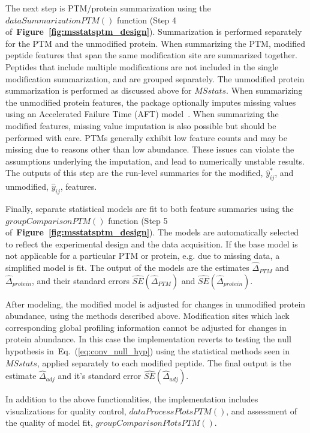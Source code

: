 \documentclass[mcp]{article}
\numberwithin{table}{section}
\def\eqref#1{Eq.~(\ref{eq:#1})}
\def\figref#1{{\bf Figure~\ref{fig:#1}}}
\begin{document}
The next step is PTM/protein summarization using the $dataSummarizationPTM()$ function (Step 4 of~\figref{msstatsptm_design}). Summarization is performed separately for the PTM and the unmodified protein. When summarizing the PTM, modified peptide features that span the same modification site are summarized together. Peptides that include multiple modifications are not included in the single modification summarization, and are grouped separately. The unmodified protein summarization is performed as discussed above for $MSstats$. When summarizing the unmodified protein features, the package optionally imputes missing values using an Accelerated Failure Time (AFT) model~\cite{Wei:1992}. When summarizing the modified features, missing value imputation is also possible but should be performed with care. PTMs generally exhibit low feature counts and may be missing due to reasons other than low abundance. These issues can violate the assumptions underlying the imputation, and lead to numerically unstable results. The outputs of this step are the run-level summaries for the modified, $\hat{y}_{ij}^{\ast}$, and unmodified, $\hat{y}_{ij}$, features.

Finally, separate statistical models are fit to both feature summaries using the $groupComparisonPTM()$ function (Step 5 of~\figref{msstatsptm_design}). The models are automatically selected to reflect the experimental design and the data acquisition. If the base model is not applicable for a particular PTM or protein, e.g. due to missing data, a simplified model is fit. The output of the models are the estimates $\hat{\Delta}_{PTM}$ and $\hat{\Delta}_{protein}$, and their standard errors $\widehat{SE}(\hat{\Delta}_{PTM})$ and $\widehat{SE}(\hat{\Delta}_{protein})$. 

After modeling, the modified model is adjusted for changes in unmodified protein abundance, using the methods described above. Modification sites which lack corresponding global profiling information cannot be adjusted for changes in protein abundance. In this case the implementation reverts to testing the null hypothesis in~\eqref{conv_null_hyp} using the statistical methods seen in $MSstats$, applied separately to each modified peptide. The final output is the estimate $\hat{\Delta}_{adj}$ and it's standard error $\widehat{SE}(\hat{\Delta}_{adj})$.

In addition to the above functionalities, the implementation includes visualizations for quality control, $dataProcessPlotsPTM()$, and assessment of the quality of model fit, $groupComparisonPlotsPTM()$.
\end{document}
